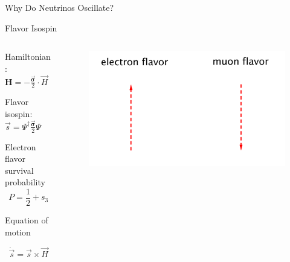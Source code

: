 \documentclass[9pt]{beamer}
\begin{document}
\begin{darkframes}
\begin{frame}[fragile]{Why Do Neutrinos Oscillate?}
\begin{tcolorbox}[standard jigsaw, opacityback=0,coltext=white]
\end{tcolorbox}






\end{frame}



\begin{frame}{Flavor Isospin}








\begin{columns}[T]
\begin{column}{0.5\textwidth}


Hamiltonian: $\mathbf H = - \frac{\vec{\boldsymbol{\sigma}} }{2}\cdot \vec H$


Flavor isospin: $\vec s = \Psi^{\dagger} \frac{\vec{\boldsymbol{\sigma}} }{2} \Psi $

\small
Electron flavor survival probability
\vspace*{0pt}
\begin{equation*}
P = \frac{1}{2} + s_3
\end{equation*}


Equation of motion

\begin{equation*}
\dot{\vec s} = \vec s \times \vec H
\end{equation*}




\end{column}%
\begin{column}{0.5\textwidth}

\begin{figure}
    \centering
    \includegraphics[width=\textwidth]{assets/flavor-isospin-illus}
\end{figure}


\end{column}
\end{columns}
\end{frame}
\end{darkframes}
\end{document}
